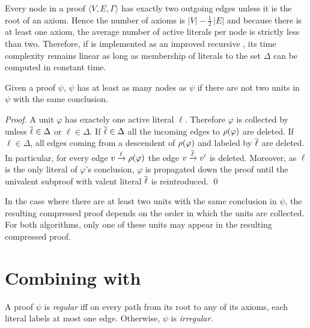 \documentclass{llncs}
\begin{document}
Every node in a proof $\langle V, E, \Gamma \rangle$ has exactly two outgoing edges unless it is the
root of an axiom. Hence the number of axioms is $|V| - \frac{1}{2}\,|E|$ and because there is at
least one axiom, the average number of active literals per node is strictly less than two.
Therefore, if {\LowerUnivalents} is implemented as an improved recursive , its time
complexity remains linear as long as membership of literals to the set $\Delta$ can be computed in
constant time.

\begin{proposition}
Given a proof $\psi$,
{\LowerUnits\FuncSty{(}$\psi$\FuncSty{)}}
has at least as many nodes as 
{\LowerUnivalents\FuncSty{(}$\psi$\FuncSty{)}}
if there are not two units in $\psi$ with the same conclusion.
\end{proposition}

\begin{proof}
A unit $\varphi$ has exactely one active literal $\ell$. Therefore $\varphi$ is collected by
{\LowerUnivalents} unless $\overline{\ell} \in \Delta$ or $\ell \in \Delta$. If $\overline{\ell} \in \Delta$
all the incoming edges to $\rho(\varphi)$ are deleted. If $\ell \in \Delta$, all edges coming from
a descendent of $\rho(\varphi)$ and labeled by $\overline{\ell}$ are deleted. In particular, for every
edge $v \xrightarrow{\ell} \rho(\varphi)$ the edge $v \xrightarrow{\overline{\ell}} v'$ is deleted.
Moreover, as $\ell$ is the only literal of $\varphi$'s conclusion, $\varphi$ is propagated down the
proof until the univalent subproof with valent literal $\overline{\ell}$ is reintroduced. \qed
\end{proof}

In the case where there are at least two units with the same conclusion in $\psi$, the resulting
compressed proof depends on the order in which the units are collected. For both algorithms, only one of these
units may appear in the resulting compressed proof.



\section{Combining {\LowerUnivalents} with {\RPI}} \label{sec:LUnivRPI}

\begin{definition}
A proof $\psi$ is \emph{regular} iff on every path from its root to any of its axioms, each literal
labels at most one edge. Otherwise, $\psi$ is \emph{irregular}.
\end{definition}
\end{document}
